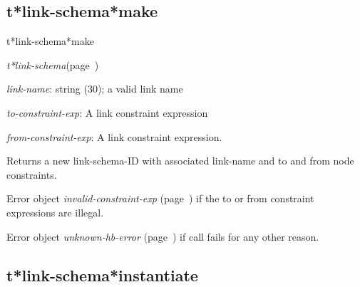 \subsection{t*link-schema*make}
\label{t*link-schema*make}

\begin{description}
\item [Name:]  t*link-schema*make

\item [Class:] {\sl t*link-schema}\hfill(page~\pageref{t*link-schema})

\item [Parameters:]
\item {\sl link-name}:  string (30); a valid link name

\item {\sl to-constraint-exp}:  A link constraint expression


\item {\sl from-constraint-exp}:  A link constraint expression.



\item [Return-value:]

Returns a new link-schema-ID with 
associated link-name and to and from node constraints. 

Error object {\sl invalid-constraint-exp} (page~\pageref{invalid-constraint-exp}) if the to
or from constraint expressions are illegal.

Error object {\sl unknown-hb-error} (page~\pageref{unknown-hb-error}) if call fails for
any other reason. 


\item [Description:]


\item [Public:]



\end{description}
\horizontalline

\subsection{t*link-schema*instantiate}
\label{t*link-schema*instantiate}

